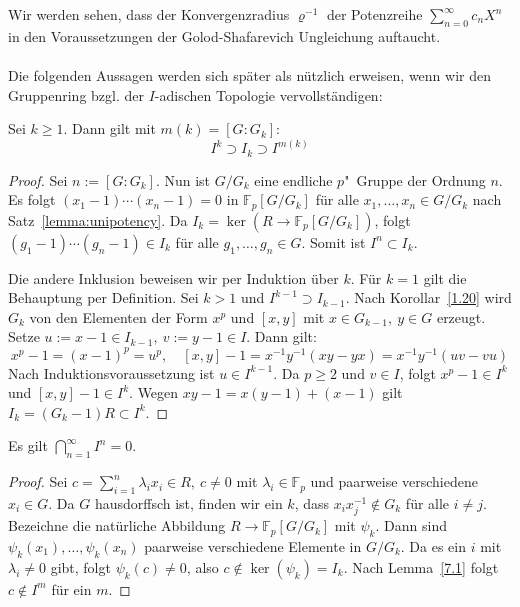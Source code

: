 \documentclass[11pt,a4paper,openany]{memoir}
\begin{document}
\begin{remark}
Wir werden sehen, dass der Konvergenzradius $\varrho^{-1}$ der Potenzreihe $\sum_{n=0}^\infty c_nX^n$ in den Voraussetzungen der Golod-Shafarevich Ungleichung auftaucht.
\end{remark}

\paragraph{} Die folgenden Aussagen werden sich später als nützlich erweisen, wenn wir den Gruppenring bzgl. der $I$-adischen Topologie vervollständigen:

\begin{lemma}\label{7.1} Sei $k\geq 1$. Dann gilt mit $m(k)=[G:G_k]$:
\[I^k\supset I_k \supset I^{m(k)}\]
\end{lemma}

\begin{proof}
Sei $n:=[G:G_k]$. Nun ist $G/G_k$ eine endliche $p$"~Gruppe der Ordnung $n$. Es folgt $(x_1-1)\cdots(x_n-1)=0$ in $\mathbb{F}_p[G/G_k]$ für alle $x_1,\ldots,x_n\in G/G_k$ nach Satz~\ref{lemma:unipotency}. Da $I_k=\ker(R\to \mathbb{F}_p[G/G_k])$, folgt $(g_1-1)\cdots(g_n-1)\in I_k$ für alle $g_1,\ldots,g_n\in G$. Somit ist $I^n\subset I_k$.

Die andere Inklusion beweisen wir per Induktion über $k$. Für $k=1$ gilt die Behauptung per Definition. Sei $k>1$ und $I^{k-1}\supset I_{k-1}$. Nach Korollar~\ref{1.20} wird $G_k$ von den Elementen der Form $x^p$ und $[x,y]$ mit $x\in G_{k-1},\ y\in G$ erzeugt. Setze $u:=x-1\in I_{k-1},\ v:=y-1\in I$. Dann gilt:
\[x^p-1=(x-1)^p=u^p,\quad [x,y]-1=x^{-1}y^{-1}(xy-yx)=x^{-1}y^{-1}(uv-vu) \]
Nach Induktionsvoraussetzung ist $u\in I^{k-1}$. Da $p\geq 2$ und $v\in I$, folgt $x^p-1\in I^k$ und $[x,y]-1\in I^k$. Wegen $xy-1=x(y-1)+(x-1)$ gilt $I_k=(G_k-1)R\subset I^k$.
\end{proof}

\begin{corollary}\label{7.2}
Es gilt $\bigcap_{n=1}^\infty I^n=0$.
\end{corollary}

\begin{proof}
Sei $c=\sum_{i=1}^n \lambda_ix_i\in R,\ c\neq 0$ mit $\lambda_i\in \mathbb{F}_p$ und paarweise verschiedene $x_i\in G$. Da $G$ hausdorffsch ist, finden wir ein $k$, dass $x_ix_j^{-1}\not\in G_k$ für alle $i\neq j$. Bezeichne die natürliche Abbildung $R\to \mathbb{F}_p[G/G_k]$ mit $\psi_k$. Dann sind $\psi_k(x_1),\ldots,\psi_k(x_n)$ paarweise verschiedene Elemente in $G/G_k$. Da es ein $i$ mit $\lambda_i\neq 0$ gibt, folgt $\psi_k(c)\neq 0$, also $c\not\in \ker(\psi_k)=I_k$. Nach Lemma~\ref{7.1} folgt $c\not\in I^m$ für ein $m$.
\end{proof}
\end{document}
